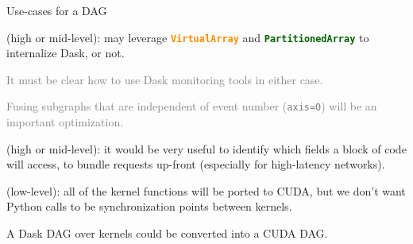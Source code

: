 \documentclass[aspectratio=169]{beamer}
\begin{document}
\begin{frame}{Use-cases for a DAG}
\large
\vspace{0.3 cm}
\begin{description}\setlength{\itemsep}{0.25 cm}
\item[\bf Distributed computing] (high or mid-level): may leverage \textcolor{darkorange}{\tt\textbf{VirtualArray}} and \textcolor{darkgreen}{\tt\textbf{PartitionedArray}} to internalize Dask, or not.

\vspace{0.2 cm}
\textcolor{gray}{It must be clear how to use Dask monitoring tools in either case.}

\vspace{0.2 cm}
\textcolor{gray}{Fusing subgraphs that are independent of event number ({\tt axis=0}) will be an important optimization.}

\item[\bf Static analysis] (high or mid-level): it would be very useful to identify which fields a block of code will access, to bundle requests up-front (especially for high-latency networks).

\item[\bf Streamlining GPU code] (low-level): all of the kernel functions will be ported to CUDA, but we don't want Python calls to be synchronization points between kernels.

\vspace{0.2 cm}
A Dask DAG over kernels could be converted into a CUDA DAG.
\end{description}
\end{frame}
\end{document}
